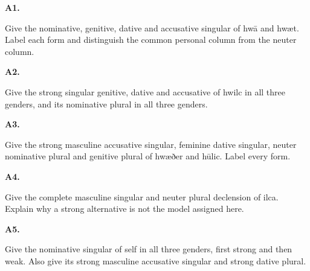 \par\begin{minipage}{\linewidth}\raggedright
\textbf{A1.}

Give the nominative, genitive, dative and accusative singular of hwā and hwæt. Label each form and distinguish the common personal column from the neuter column.

\end{minipage}\par\addvspace{4pt}

\par\begin{minipage}{\linewidth}\raggedright
\textbf{A2.}

Give the strong singular genitive, dative and accusative of hwilc in all three genders, and its nominative plural in all three genders.

\end{minipage}\par\addvspace{4pt}

\par\begin{minipage}{\linewidth}\raggedright
\textbf{A3.}

Give the strong masculine accusative singular, feminine dative singular, neuter nominative plural and genitive plural of hwæðer and hūlic. Label every form.

\end{minipage}\par\addvspace{4pt}

\par\begin{minipage}{\linewidth}\raggedright
\textbf{A4.}

Give the complete masculine singular and neuter plural declension of ilca. Explain why a strong alternative is not the model assigned here.

\end{minipage}\par\addvspace{4pt}

\par\begin{minipage}{\linewidth}\raggedright
\textbf{A5.}

Give the nominative singular of self in all three genders, first strong and then weak. Also give its strong masculine accusative singular and strong dative plural.

\end{minipage}\par\addvspace{4pt}

